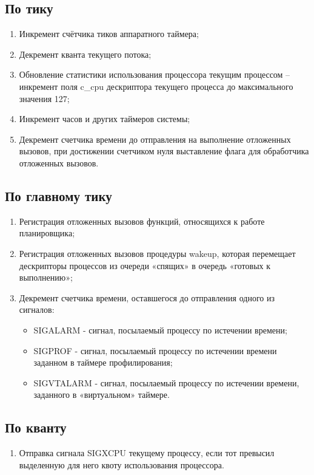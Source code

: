 \subsection{По тику}
\begin{enumerate}
	\item Инкремент счётчика тиков аппаратного таймера;
	\item Декремент кванта текущего потока;
	\item Обновление статистики использования процессора текущим процессом – инкремент поля c\_cpu дескриптора текущего процесса до максимального значения 127;
	\item Инкремент часов и других таймеров системы;
	\item Декремент счетчика времени до отправления на выполнение отложенных вызовов, при достижении счетчиком нуля выставление флага для обработчика отложенных вызовов.
\end{enumerate}

\subsection{По главному тику}
\begin{enumerate}
	\item Регистрация отложенных вызовов функций, относящихся к работе планировщика;
	\item Регистрация отложенных вызовов процедуры wakeup, которая перемещает дескрипторы процессов из очереди «спящих» в очередь «готовых к выполнению»;
	\item Декремент счетчика времени, оставшегося до отправления одного из сигналов:
	\begin{itemize}
		\item SIGALARM - сигнал, посылаемый процессу по истечении времени;
		\item SIGPROF - сигнал, посылаемый процессу по истечении времени заданном в таймере профилирования;
		\item SIGVTALARM - сигнал, посылаемый процессу по истечении времени, заданного
		в «виртуальном» таймере.
	\end{itemize}
\end{enumerate}

\subsection{По кванту}
\begin{enumerate}
	\item Отправка сигнала SIGXCPU текущему процессу, если тот превысил выделенную для него квоту использования процессора.
\end{enumerate}

